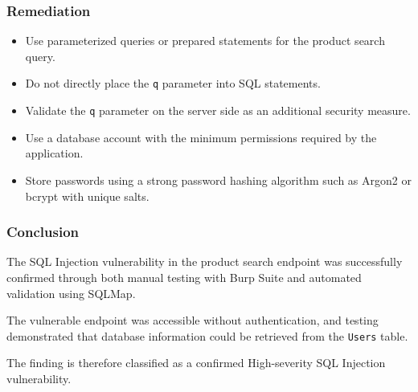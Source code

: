 \subsubsection*{Remediation}

\begin{itemize}

    \item Use parameterized queries or prepared statements for the
    product search query.

    \item Do not directly place the \texttt{q} parameter into SQL
    statements.

    \item Validate the \texttt{q} parameter on the server side as an
    additional security measure.

    \item Use a database account with the minimum permissions
    required by the application.

    \item Store passwords using a strong password hashing algorithm
    such as Argon2 or bcrypt with unique salts.

\end{itemize}

\subsubsection*{Conclusion}

The SQL Injection vulnerability in the product search endpoint was
successfully confirmed through both manual testing with Burp Suite
and automated validation using SQLMap.

The vulnerable endpoint was accessible without authentication, and
testing demonstrated that database information could be retrieved
from the \texttt{Users} table.

The finding is therefore classified as a confirmed High-severity
SQL Injection vulnerability.